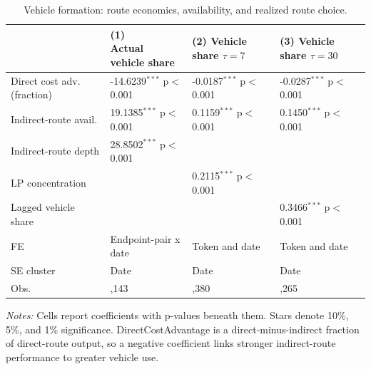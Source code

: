 \documentclass[12pt]{article}
\begin{document}
\begin{landscape}
\begin{table}[!htbp]
\centering
\scriptsize
\setlength{\tabcolsep}{2.5pt}
\begin{threeparttable}
\caption{Vehicle formation: route economics, availability, and realized route choice.}
\label{tab:rq1-formation}
\begin{tabular}{@{}>{\raggedright\arraybackslash}p{}>{\raggedright\arraybackslash}p{}>{\raggedright\arraybackslash}p{}>{\raggedright\arraybackslash}p{}@{}}
\toprule
 & \makecell{(1) \\ Actual \\ vehicle share} & \makecell{(2) \\ Vehicle share \\ $\tau=7$} & \makecell{(3) \\ Vehicle share \\ $\tau=30$} \\
\midrule
Direct cost adv. (fraction) & \makecell{-14.6239$^{***}$ \\ {\scriptsize p$<$0.001}} & \makecell{-0.0187$^{***}$ \\ {\scriptsize p$<$0.001}} & \makecell{-0.0287$^{***}$ \\ {\scriptsize p$<$0.001}} \\
Indirect-route avail. & \makecell{19.1385$^{***}$ \\ {\scriptsize p$<$0.001}} & \makecell{0.1159$^{***}$ \\ {\scriptsize p$<$0.001}} & \makecell{0.1450$^{***}$ \\ {\scriptsize p$<$0.001}} \\
Indirect-route depth & \makecell{28.8502$^{***}$ \\ {\scriptsize p$<$0.001}} &  &  \\
LP concentration &  & \makecell{0.2115$^{***}$ \\ {\scriptsize p$<$0.001}} &  \\
Lagged vehicle share &  &  & \makecell{0.3466$^{***}$ \\ {\scriptsize p$<$0.001}} \\
FE & Endpoint-pair x date & Token and date & Token and date \\
SE cluster & Date & Date & Date \\
Obs. & 189,143 & 9,380 & 9,265 \\
\bottomrule
\end{tabular}
\begin{tablenotes}[flushleft]
\footnotesize
\item \textit{Notes:} Cells report coefficients with p-values beneath them. Stars denote 10\%, 5\%, and 1\% significance. DirectCostAdvantage is a direct-minus-indirect fraction of direct-route output, so a negative coefficient links stronger indirect-route performance to greater vehicle use.
\end{tablenotes}
\end{threeparttable}
\end{table}
\end{landscape}
\end{document}
